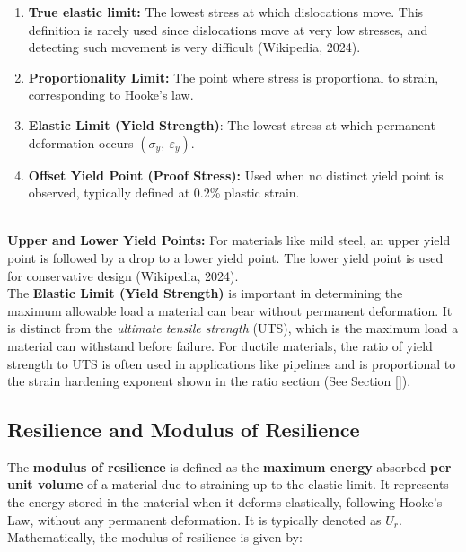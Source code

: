\documentclass{article}
\begin{document}
{\begin{minipage}{0.4\textwidth}
\begin{figure}[H]
     \label{fig:str}
 \end{figure} 
 \end{minipage}\hfil
\begin{minipage}{0.6\textwidth}
 \begin{enumerate}
     \item \textbf{True elastic limit:} The lowest stress at which dislocations move. This definition is rarely used since dislocations move at very low stresses, and detecting such movement is very difficult (Wikipedia, 2024).
     \item \textbf{Proportionality Limit:} The point where stress is proportional to strain, corresponding to Hooke's law.
     \item \textbf{Elastic Limit (Yield Strength)}: The lowest stress at which permanent deformation occurs \((\sigma_y,\ \varepsilon_y)\).
     \item \textbf{Offset Yield Point (Proof Stress):} Used when no distinct yield point is observed, typically defined at 0.2\% plastic strain.
 \end{enumerate}
  \end{minipage}\\[8pt]
\textbf{Upper and Lower Yield Points:} For materials like mild steel, an upper yield point is followed by a drop to a lower yield point. The lower yield point is used for conservative design (Wikipedia, 2024).\\[8pt]
The \textbf{Elastic Limit (Yield Strength)} is important in determining the maximum allowable load a material can bear without permanent deformation. It is distinct from the \textit{ultimate tensile strength} (UTS), which is the maximum load a material can withstand before failure. For ductile materials, the ratio of yield strength to UTS is often used in applications like pipelines and is proportional to the strain hardening exponent shown in the ratio section (See Section \ref{}).
    
\newpage    

\subsection{Resilience and Modulus of Resilience}\label{mor}

The \textbf{modulus of resilience} is defined as the \textbf{maximum energy} absorbed \textbf{per unit volume} of a material due to straining up to the elastic limit. It represents the energy stored in the material when it deforms elastically, following Hooke's Law, without any permanent deformation. It is typically denoted as \( U_r \). Mathematically, the modulus of resilience is given by:

}
\end{document}
